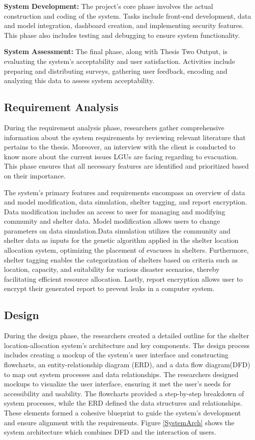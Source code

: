 	\textbf{System Development:} The project's core phase involves the actual construction and coding of the system. Tasks include front-end development, data and model integration, dashboard creation, and implementing security features. This phase also includes testing and debugging to ensure system functionality.
	
	\textbf{System Assessment:} The final phase, along with Thesis Two Output, is evaluating the system's acceptability and user satisfaction. Activities include preparing and distributing surveys, gathering user feedback, encoding and analyzing this data to assess system acceptability.

\subsection{Requirement Analysis}
	During the requirement analysis phase, researchers gather comprehensive information about the system requirements by reviewing relevant literature that pertains to the thesis. Moreover, an interview with the client is conducted to know more about the current issues LGUs are facing regarding to evacuation. This phase ensures that all necessary features are identified and prioritized based on their importance.
	
	The system's primary features and requirements encompass an overview of data and model modification, data simulation, shelter tagging, and report encryption. Data modification includes an access to user for managing and modifying community and shelter data. Model modification allows users to change parameters on data simulation.Data simulation utilizes the community and shelter data as inputs for the genetic algorithm applied in the shelter location allocation system, optimizing the placement of evacuees in shelters. Furthermore, shelter tagging enables the categorization of shelters based on criteria such as location, capacity, and suitability for various disaster scenarios, thereby facilitating efficient resource allocation. Lastly, report encryption allows user to encrypt their generated report to prevent leaks in a computer system.
	
\subsection{Design}
	During the design phase, the researchers created a detailed outline for the shelter location-allocation system's architecture and key components. The design process includes creating a mockup of the system's user interface and constructing flowcharts, an entity-relationship diagram (ERD), and a data flow diagram(DFD) to map out system processes and data relationships. The researchers designed mockups to visualize the user interface, ensuring it met the user's needs for accessibility and usability. The flowcharts provided a step-by-step breakdown of system processes, while the ERD defined the data structures and relationships. These elements formed a cohesive blueprint to guide the system's development and ensure alignment with the requirements. Figure \ref{SystemArch} shows the system architecture which combines DFD and the interaction of users.


